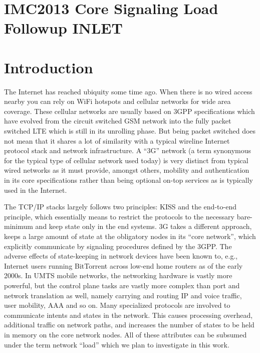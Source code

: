 

\section{IMC2013 Core Signaling Load Followup INLET}

\section{Introduction}
\label{sec:introduction-IMC}


The Internet has reached ubiquity some time ago. When there is no wired access nearby you can rely on WiFi hotspots and cellular networks for wide area coverage. These cellular networks are usually based on \ac{3GPP} specifications which have evolved from the circuit switched \ac{GSM} network into the fully packet switched \ac{LTE} which is still in its unrolling phase. But being packet switched does not mean that it shares a lot of similarity with a typical wireline Internet protocol stack and network infrastructure. A ``3G'' network (a term synonymous for the typical type of cellular network used today) is very distinct from typical wired networks as it must provide, amongst others, mobility and authentication in its core specifications rather than being optional on-top services as is typically used in the Internet.

The TCP/IP stacks largely follows two principles: \ac{KISS} and the end-to-end principle\cite{saltzer1984end}, which essentially means to restrict the protocols to the necessary bare-minimum and keep state only in the end systems. 3G takes a different approach, keeps a large amount of state at the obligatory nodes in its ``core network'', which explicitly communicate by signaling procedures defined by the \ac{3GPP}.
The adverse effects of state-keeping in network devices have been known to, e.g.,  Internet users running BitTorrent across low-end home routers as of the early 2000s. In \ac{UMTS} mobile networks, the networking hardware is vastly more powerful, but the control plane tasks are vastly more complex than port and network translation as well, namely carrying and routing IP and voice traffic, user mobility, \ac{AAA} and so on. Many specialized protocols are involved to communicate intents and states in the network. This causes processing overhead, additional traffic on network paths, and increases the number of states to be held in memory on the core network nodes. All of these attributes can be subsumed under the term network ``load'' which we plan to investigate in this work.

